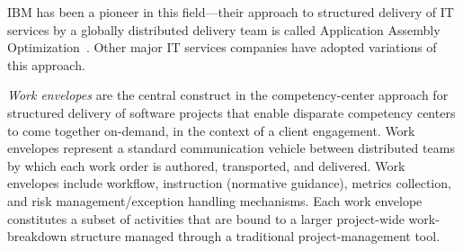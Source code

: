 IBM has been a pioneer in this field---their approach to structured delivery of
IT services by a globally distributed delivery team is called Application
Assembly Optimization~\cite{gloaao}. Other major IT services companies have
adopted variations of this approach.

\textit{Work envelopes} are the central construct in the competency-center
approach for structured delivery of software projects that enable disparate
competency centers to come together on-demand, in the context of a client
engagement.  Work envelopes represent a standard communication vehicle between
distributed teams by which each work order is authored, transported, and
delivered. Work envelopes include workflow, instruction (normative guidance),
metrics collection, and risk management/exception handling mechanisms. Each work
envelope constitutes a subset of activities that are bound to a larger
project-wide work-breakdown structure managed through a traditional
project-management tool.


